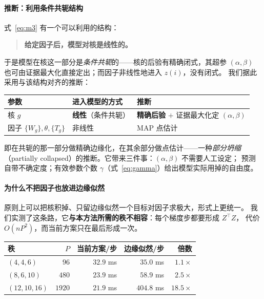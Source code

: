 \documentclass[11pt,a4paper]{article}
\begin{document}
\paragraph{推断：利用条件共轭结构}
式~\eqref{eq:m3} 有一个可以利用的结构：

\begin{quote}
\textbf{给定因子后，模型对核是线性的。}
\end{quote}

于是模型在核这一部分是\emph{条件共轭}的——核的后验有精确闭式，其超参
$(\alpha,\beta)$ 也可由证据最大化直接定出；而因子非线性地进入 $z(i)$，没有闭式。
我们据此采用与该结构对齐的推断：

\begin{center}
\begin{tabular}{@{}lll@{}}
\toprule
参数 & 进入模型的方式 & 推断\\
\midrule
核 $g$ & \textbf{线性}（条件共轭） & \textbf{精确后验} $+$ 证据最大化定 $(\alpha,\beta)$\\
因子 $\{W_g\},\theta,\{T_g\}$ & 非线性 & MAP 点估计\\
\bottomrule
\end{tabular}
\end{center}

即在共轭的那一部分做精确边缘化，在其余部分做点估计——一种\emph{部分坍缩}
（partially collapsed）的推断。它带来三件事：$(\alpha,\beta)$ 不需要人工设定；
预测自带不确定度；有效参数个数 $\gamma$（式~\eqref{eq:gamma}）给出模型实际用掉的自由度。

\paragraph{为什么不把因子也放进边缘似然}
原则上可以把核积掉、只留边缘似然一个目标对因子求极大，形式上更统一。
我们实测了这条路，它\textbf{与本方法所需的秩不相容}：每个梯度步都要形成 $Z^\top Z$，
代价 $O(nP^2)$，而当前方案只在最后形成一次。

\begin{center}\small
\begin{tabular}{@{}lrrrr@{}}
\toprule
秩 & $P$ & 当前方案/步 & 边缘似然/步 & 倍数\\
\midrule
$(4,4,6)$ & $96$ & $32.9$ ms & $35.0$ ms & $1.1\times$\\
$(8,6,10)$ & $480$ & $23.9$ ms & $58.9$ ms & $2.5\times$\\
$(12,10,16)$ & $1920$ & $21.9$ ms & $404.8$ ms & $\mathbf{18.5\times}$\\
\bottomrule
\end{tabular}
\end{center}
\end{document}
